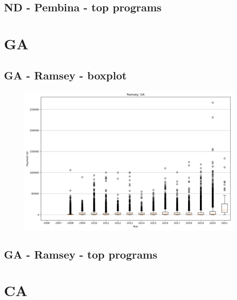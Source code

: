 \subsection*{ND - Pembina - top programs}

\newpage
\section*{GA}
\subsection*{GA - Ramsey - boxplot}
\begin{figure}[h]
\centering
\includegraphics[width=7in]{../output/boxplots/counties/Ramsey-GA_boxplot.png}
\end{figure}


\subsection*{GA - Ramsey - top programs}

\newpage
\section*{CA}
